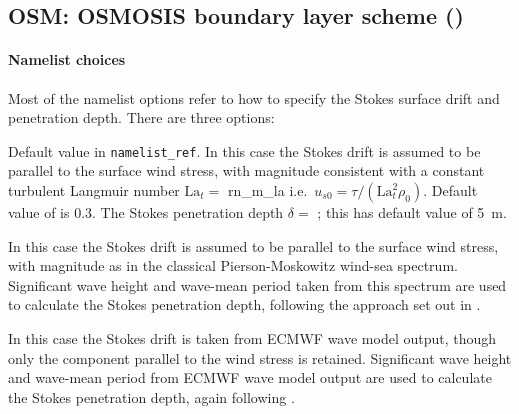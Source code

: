 \documentclass[../main/NEMO_manual]{subfiles}
\begin{document}
\subsection[OSM: OSMOSIS boundary layer scheme (\forcode{ln_zdfosm = .true.})]
{OSM: OSMOSIS boundary layer scheme (\protect{})}
\label{subsec:ZDF_osm}

\begin{listing}
  \caption{}
  \label{lst:namzdf_osm}
\end{listing}

\paragraph{Namelist choices}
Most of the namelist options refer to how to specify the Stokes
surface drift and penetration depth. There are three options:
\begin{description}
  \item \protect{} Default value in \texttt{namelist\_ref}. In this case the Stokes drift is
      assumed to be parallel to the surface wind stress, with
      magnitude consistent with a constant turbulent Langmuir number
    $\mathrm{La}_t=$ \protect{} i.e.\
    $u_{s0}=\tau/(\mathrm{La}_t^2\rho_0)$.  Default value of
    \protect\np{rn_m_la}{rn\_m\_la} is 0.3. The Stokes penetration
      depth $\delta = $ \protect{}; this has default value
      of 5~m.

  \item \protect{} In this case the Stokes drift is
      assumed to be parallel to the surface wind stress, with
      magnitude as in the classical Pierson-Moskowitz wind-sea
      spectrum.  Significant wave height and
      wave-mean period taken from this spectrum are used to calculate the Stokes penetration
      depth, following the approach set out in  \citet{breivik.janssen.ea_JPO14}.

    \item \protect{} In this case the Stokes drift is
      taken from  ECMWF wave model output, though only the component parallel
      to the wind stress is retained. Significant wave height and
      wave-mean period from ECMWF wave model output are used to calculate the Stokes penetration
      depth, again following \citet{breivik.janssen.ea_JPO14}.

    \end{description}
\end{document}
